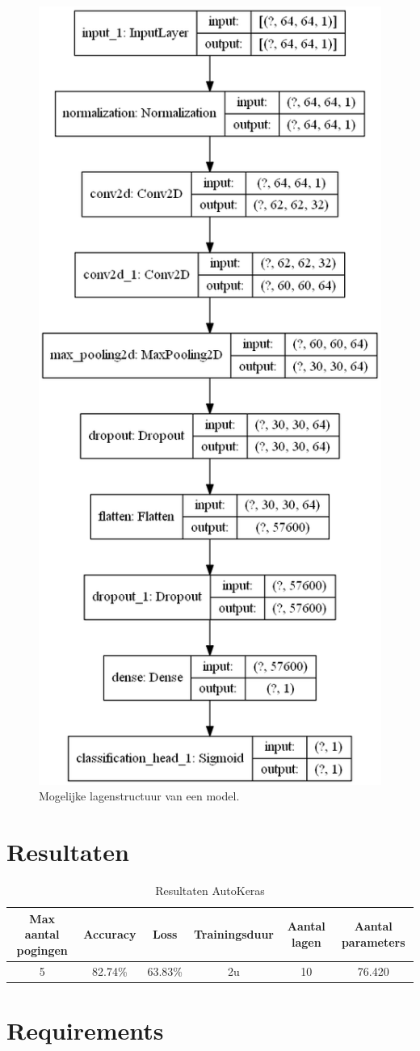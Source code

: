 \begin{figure}
    \centering
    \includegraphics[width=0.7\linewidth]{img/model-samenvatting.png}
    \caption{Mogelijke lagenstructuur van een model.}
    \label{fig:layer-autokeras}
\end{figure}

\section{Resultaten}
\label{sec:results-autokeras}


\begin{table}[ht]
    \centering
    \begin{tabular}{c c c c c c} %
        \hline\hline %
        Max aantal pogingen & Accuracy & Loss & Trainingsduur & Aantal lagen & Aantal parameters \\ [0.5ex] %
        \hline %
        5   & 82.74\%   & 63.83\%   & 2u    & 10    & 76.420 \\ 
        \hline %
    \end{tabular}
    \caption{Resultaten AutoKeras}
    \label{table:autokeras-results}
\end{table}


\section{Requirements}